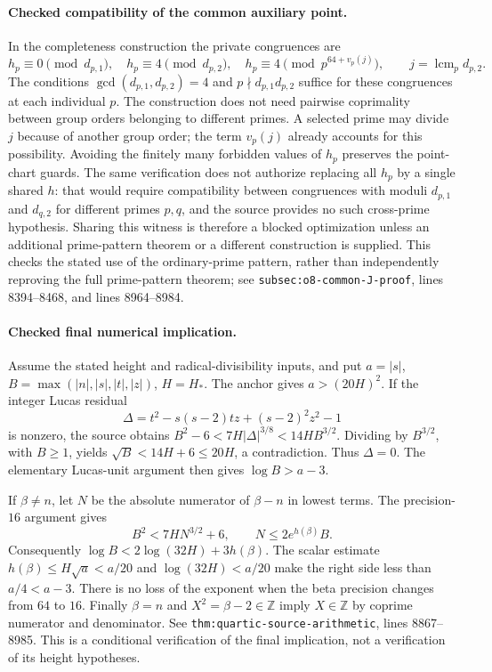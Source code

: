 \paragraph{Checked compatibility of the common auxiliary point.}
In the completeness construction the private congruences are
\[
 h_p\equiv0\pmod{d_{p,1}},\quad
 h_p\equiv4\pmod{d_{p,2}},\quad
 h_p\equiv4\pmod{p^{64+v_p(j)}},\qquad
 j=\operatorname{lcm}_{p}d_{p,2}.
\]
The conditions $\gcd(d_{p,1},d_{p,2})=4$ and
$p\nmid d_{p,1}d_{p,2}$ suffice for these congruences at each
individual $p$.  The construction does not need pairwise coprimality
between group orders belonging to different primes.  A selected prime
may divide $j$ because of another group order; the term $v_p(j)$
already accounts for this possibility.  Avoiding the finitely many
forbidden values of $h_p$ preserves the point-chart guards.
The same verification does not authorize replacing all $h_p$ by a single
shared $h$: that would require compatibility between congruences with
moduli $d_{p,1}$ and $d_{q,2}$ for different primes $p,q$, and the source
provides no such cross-prime hypothesis.  Sharing this witness is therefore
a blocked optimization unless an additional prime-pattern theorem or a
different construction is supplied.  This checks the stated use of the
ordinary-prime pattern, rather than independently reproving the full
prime-pattern theorem; see
\texttt{subsec:o8-common-J-proof}, lines 8394--8468, and lines
8964--8984.

\paragraph{Checked final numerical implication.}
Assume the stated height and radical-divisibility inputs, and put
$a=|s|$, $B=\max(|n|,|s|,|t|,|z|)$, $H=H_*$.
The anchor gives $a>(20H)^2$.  If the integer Lucas residual
\[
 \Delta=t^2-s(s-2)tz+(s-2)^2z^2-1
\]
is nonzero, the source obtains
$B^2-6<7H|\Delta|^{3/8}<14HB^{3/2}$.
Dividing by $B^{3/2}$, with $B\ge1$, yields
$\sqrt B<14H+6\le20H$, a contradiction.  Thus $\Delta=0$.
The elementary Lucas-unit argument then gives $\log B>a-3$.

If $\beta\ne n$, let $N$ be the absolute numerator of
$\beta-n$ in lowest terms.  The precision-$16$ argument gives
\[
 B^2<7HN^{3/2}+6,\qquad N\le2e^{h(\beta)}B.
\]
Consequently
$\log B<2\log(32H)+3h(\beta)$.
The scalar estimate $h(\beta)\le H\sqrt a<a/20$ and
$\log(32H)<a/20$ make the right side less than $a/4<a-3$.
There is no loss of the exponent when the beta precision changes
from $64$ to $16$.  Finally $\beta=n$ and
$X^2=\beta-2\in\mathbb Z$ imply $X\in\mathbb Z$ by coprime
numerator and denominator.  See \texttt{thm:quartic-source-arithmetic},
lines 8867--8985.  This is a conditional verification of the final
implication, not a verification of its height hypotheses.

